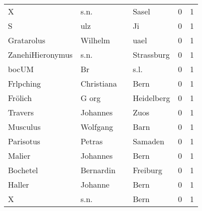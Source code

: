 \begin{center}
\begin{tiny}
\begin{longtabu}{llllrr}
                        X &                               s.n. &             &                                       Sasel &          0 &         1 \\
                        S &                                ulz &             &                                          Ji &          0 &         1 \\
               Gratarolus &                            Wilhelm &             &                                        uael &          0 &         1 \\
         ZanehiHieronymus &                               s.n. &             &                                  Strassburg &          0 &         1 \\
                    bocUM &                                 Br &             &                                        s.l. &          0 &         1 \\
                Frlpching &                         Christiana &             &                                        Bern &          0 &         1 \\
                  Frölich &                              G org &             &                                  Heidelberg &          0 &         1 \\
                  Travers &                           Johannes &             &                                        Zuos &          0 &         1 \\
                 Musculus &                           Wolfgang &             &                                        Barn &          0 &         1 \\
                Parisotus &                             Petras &             &                                     Samaden &          0 &         1 \\
                   Malier &                           Johannes &             &                                        Bern &          0 &         1 \\
                 Bochetel &                          Bernardin &             &                                    Freiburg &          0 &         1 \\
                   Haller &                            Johanne &             &                                        Bern &          0 &         1 \\
                        X &                               s.n. &             &                                        Bern &          0 &         1 \\

\end{longtabu}
\end{tiny}
\end{center}
